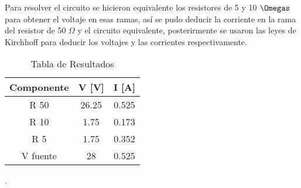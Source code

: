 \documentclass{article}
\begin{document}
Para resolver el circuito se hicieron equivalente los resistores de 5 y 10 $\Omegas$ para obtener el voltaje en esas ramas, así se pudo deducir la corriente en la rama del resistor de 50 $\Omega$ y el circuito equivalente, posterirmente se usaron las leyes de Kirchhoff para deducir los voltajes y las corrientes respectivamente.

\begin{table}[h!]
\centering

\begin{tabular}{|c|c|c|}
\hline
Componente & V {[}V{]} & I {[}A{]} \\ \hline
R 50       & 26.25     & 0.525     \\ \hline
R 10       & 1.75      & 0.173     \\ \hline
R 5        & 1.75      & 0.352     \\ \hline
V fuente   & 28        & 0.525     \\ \hline
\end{tabular}
\caption{Tabla de Resultados}
\label{tabla-resultados}

\end{table}

.\\[10cm]


\end{document}
